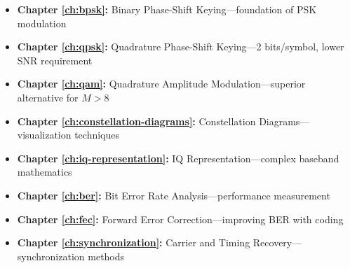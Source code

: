 \begin{itemize}
\item \textbf{Chapter \ref{ch:bpsk}:} Binary Phase-Shift Keying---foundation of PSK modulation
\item \textbf{Chapter \ref{ch:qpsk}:} Quadrature Phase-Shift Keying---2 bits/symbol, lower SNR requirement
\item \textbf{Chapter \ref{ch:qam}:} Quadrature Amplitude Modulation---superior alternative for $M > 8$
\item \textbf{Chapter \ref{ch:constellation-diagrams}:} Constellation Diagrams---visualization techniques
\item \textbf{Chapter \ref{ch:iq-representation}:} IQ Representation---complex baseband mathematics
\item \textbf{Chapter \ref{ch:ber}:} Bit Error Rate Analysis---performance measurement
\item \textbf{Chapter \ref{ch:fec}:} Forward Error Correction---improving BER with coding
\item \textbf{Chapter \ref{ch:synchronization}:} Carrier and Timing Recovery---synchronization methods
\end{itemize}
